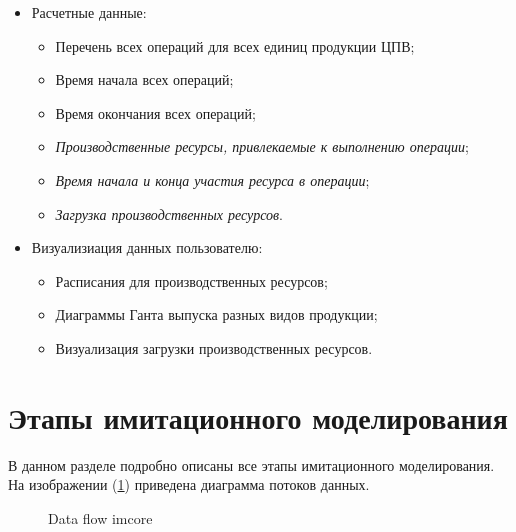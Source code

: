 \begin{itemize}
	\item Расчетные данные:	
		\begin{itemize}
			\item Перечень всех операций для всех единиц продукции ЦПВ;
			\item Время начала всех операций;
			\item Время окончания всех операций;
			\item \textit{Производственные ресурсы, привлекаемые к выполнению операции};
			\item \textit{Время начала и конца участия ресурса в операции};
			\item \textit{Загрузка производственных ресурсов}.
		\end{itemize}		
	\item Визуализиация данных пользователю:
		\begin{itemize}
			\item Расписания для производственных ресурсов;
			\item Диаграммы Ганта выпуска разных видов продукции;
			\item Визуализация загрузки производственных ресурсов.
		\end{itemize}		 
\end{itemize}

\section{Этапы имитационного моделирования}
В данном разделе подробно описаны все этапы имитационного моделирования.
На изображении (\ref{ris:DataFlow}) приведена диаграмма потоков данных.

\begin{figure}[H]
    \caption{Data flow imcore}
    \label{ris:DataFlow}
\end{figure}

